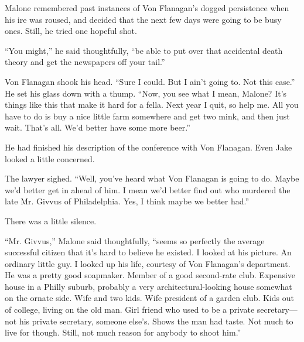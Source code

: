 \documentclass{novel}
\begin{document}
Malone remembered past instances of Von Flanagan’s dogged persistence when his ire was roused, and decided that the next few days were going to be busy ones. Still, he tried one hopeful shot.

“You might,” he said thoughtfully, “be able to put over that accidental death theory and get the newspapers off your tail.”

Von Flanagan shook his head. “Sure I could. But I ain’t going to. Not this case.” He set his glass down with a thump. “Now, you see what I mean, Malone? It’s things like this that make it hard for a fella. Next year I quit, so help me. All you have to do is buy a nice little farm somewhere and get two mink, and then just wait. That’s all. We’d better have some more beer.”

\vspace{2\nbs}
\clearpage
\thispagestyle{empty}

\begin{ChapterStart}
\vspace{3\nbs}
\end{ChapterStart}

He had finished his description of the conference with Von Flanagan. Even Jake looked a little concerned.

The lawyer sighed. “Well, you’ve heard what Von Flanagan is going to do. Maybe we’d better get in ahead of him. I mean we’d better find out who murdered the late Mr. Givvus of Philadelphia. Yes, I think maybe we better had.”

There was a little silence.

“Mr. Givvus,” Malone said thoughtfully, “seems so perfectly the average successful citizen that it’s hard to believe he existed. I looked at his picture. An ordinary little guy. I looked up his life, courtesy of Von Flanagan’s department. He was a pretty good soapmaker. Member of a good second-rate club. Expensive house in a Philly suburb, probably a very architectural-looking house somewhat on the ornate side. Wife and two kids. Wife president of a garden club. Kids out of college, living on the old man. Girl friend who used to be a private secretary—not his private secretary, someone else’s. Shows the man had taste. Not much to live for though. Still, not much reason for anybody to shoot him.”
\end{document}
